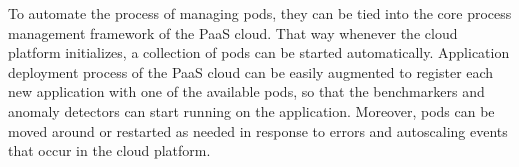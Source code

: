 To automate the process of managing pods, they can be tied into the core
process management framework of the PaaS cloud. That way whenever the cloud
platform initializes, a collection of pods can be started automatically.
Application deployment process of the PaaS cloud can be easily augmented
to register each new application with one of the available pods, so that the
benchmarkers and anomaly detectors can start running on the application.
Moreover, pods can be moved around or restarted as needed in response
to errors and autoscaling events that occur in the cloud platform.
